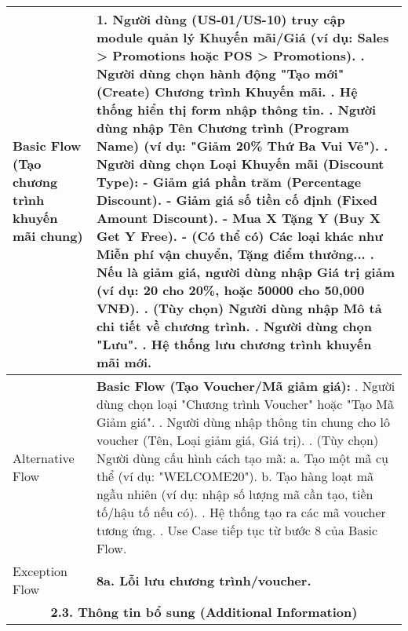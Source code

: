\begin{longtable}{|m{4cm}|p{11cm}|}
Basic Flow (Tạo chương trình khuyến mãi chung) & 1. Người dùng (US-01/US-10) truy cập module quản lý Khuyến mãi/Giá (ví dụ: Sales > Promotions hoặc POS > Promotions). \newline 2. Người dùng chọn hành động "Tạo mới" (Create) Chương trình Khuyến mãi. \newline 3. Hệ thống hiển thị form nhập thông tin. \newline 4. Người dùng nhập Tên Chương trình (Program Name) (ví dụ: "Giảm 20\% Thứ Ba Vui Vẻ"). \newline 5. Người dùng chọn Loại Khuyến mãi (Discount Type): \newline    - Giảm giá phần trăm (Percentage Discount). \newline    - Giảm giá số tiền cố định (Fixed Amount Discount). \newline    - Mua X Tặng Y (Buy X Get Y Free). \newline    - (Có thể có) Các loại khác như Miễn phí vận chuyển, Tặng điểm thưởng... \newline 6. Nếu là giảm giá, người dùng nhập Giá trị giảm (ví dụ: 20 cho 20\%, hoặc 50000 cho 50,000 VNĐ). \newline 7. (Tùy chọn) Người dùng nhập Mô tả chi tiết về chương trình. \newline 8. Người dùng chọn "Lưu". \newline 9. Hệ thống lưu chương trình khuyến mãi mới. \\
\hline
Alternative Flow & \textbf{Basic Flow (Tạo Voucher/Mã giảm giá):} \newline    1. Người dùng chọn loại "Chương trình Voucher" hoặc "Tạo Mã Giảm giá". \newline    2. Người dùng nhập thông tin chung cho lô voucher (Tên, Loại giảm giá, Giá trị). \newline    3. (Tùy chọn) Người dùng cấu hình cách tạo mã: \newline       a. Tạo một mã cụ thể (ví dụ: "WELCOME20"). \newline       b. Tạo hàng loạt mã ngẫu nhiên (ví dụ: nhập số lượng mã cần tạo, tiền tố/hậu tố nếu có). \newline    4. Hệ thống tạo ra các mã voucher tương ứng. \newline    5. Use Case tiếp tục từ bước 8 của Basic Flow. \\
\hline
Exception Flow & \textbf{8a. Lỗi lưu chương trình/voucher.} \\
\hline
\multicolumn{2}{|c|}{\textbf{2.3. Thông tin bổ sung (Additional Information)}} \\

\end{longtable}
